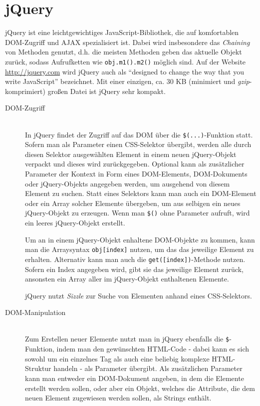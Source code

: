 \section{jQuery}
jQuery ist eine leichtgewichtiges JavaScript-Bibliothek, die auf komfortablen DOM-Zugriff und AJAX
spezialisiert ist. Dabei wird insbesondere das \emph{Chaining} von Methoden genutzt, d.h. die
meisten Methoden geben das aktuelle Objekt zurück, sodass Aufrufketten wie \lstinline{obj.m1().m2()}
möglich sind. Auf der Website \href{http://jquery.com}{http://jquery.com} wird jQuery auch als
\enquote{designed to change the way that you write JavaScript} bezeichnet. Mit einer einzigen, ca.
30 KB (minimiert und \emph{gzip}-komprimiert) großen Datei ist jQuery sehr kompakt.

\begin{description}
\item[DOM-Zugriff] \hfill \\
In jQuery findet der Zugriff auf das DOM über die \lstinline{$(...)}-Funktion statt. Sofern man als
Parameter einen CSS-Selektor übergibt, werden alle durch diesen Selektor ausgewählten Element in
einem neuen jQuery-Objekt verpackt und dieses wird zurückgegeben. Optional kann als zusätzlicher
Parameter der Kontext in Form eines DOM-Elements, DOM-Dokuments oder jQuery-Objekts angegeben
werden, um ausgehend von diesem Element zu suchen. Statt eines Selektors kann man auch ein
DOM-Element oder ein Array solcher Elemente übergeben, um aus selbigen ein neues jQuery-Objekt zu
erzeugen. Wenn man \lstinline{$()} ohne Parameter aufruft, wird ein leeres jQuery-Objekt erstellt.

Um an in einem jQuery-Objekt enhaltene DOM-Objekte zu kommen, kann man die Arraysyntax
\lstinline{obj[index]} nutzen, um das das jeweilige Element zu erhalten. Alternativ kann man auch
die \lstinline{get([index])}-Methode nutzen. Sofern ein Index angegeben wird, gibt sie das
jeweilige Element zurück, ansonsten ein Array aller im jQuery-Objekt enthaltenen Elemente.

jQuery nutzt \emph{Sizzle} zur Suche von Elementen anhand eines CSS-Selektors.

\item[DOM-Manipulation] \hfill \\
Zum Erstellen neuer Elemente nutzt man in jQuery ebenfalls die \lstinline{$}-Funktion, indem man den
gewünschten HTML-Code - dabei kann es sich sowohl um ein einzelnes Tag als auch eine beliebig
komplexe HTML-Struktur handeln - als Parameter übergibt. Als zusätzlichen Parameter kann man
entweder ein DOM-Dokument angeben, in dem die Elemente erstellt werden sollen, oder aber ein Objekt,
welches die Attribute, die dem neuen Element zugewiesen werden sollen, als Strings enthält.


\end{description}
